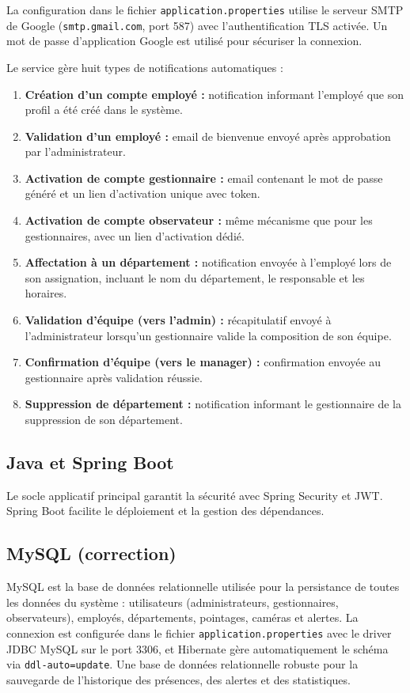 \documentclass[12pt,a4paper]{report}
\numberwithin{figure}{chapter}
\numberwithin{table}{chapter}
\begin{document}
La configuration dans le fichier \texttt{application.properties} utilise le serveur
SMTP de Google (\texttt{smtp.gmail.com}, port 587) avec l'authentification TLS activée.
Un mot de passe d'application Google est utilisé pour sécuriser la connexion.

Le service gère huit types de notifications automatiques :

\begin{enumerate}
  \item \textbf{Création d'un compte employé :} notification informant l'employé que son
    profil a été créé dans le système.
  \item \textbf{Validation d'un employé :} email de bienvenue envoyé après approbation par
    l'administrateur.
  \item \textbf{Activation de compte gestionnaire :} email contenant le mot de passe
    généré et un lien d'activation unique avec token.
  \item \textbf{Activation de compte observateur :} même mécanisme que pour les gestionnaires,
    avec un lien d'activation dédié.
  \item \textbf{Affectation à un département :} notification envoyée à l'employé lors de
    son assignation, incluant le nom du département, le responsable et les horaires.
  \item \textbf{Validation d'équipe (vers l'admin) :} récapitulatif envoyé à l'administrateur
    lorsqu'un gestionnaire valide la composition de son équipe.
  \item \textbf{Confirmation d'équipe (vers le manager) :} confirmation envoyée au
    gestionnaire après validation réussie.
  \item \textbf{Suppression de département :} notification informant le gestionnaire
    de la suppression de son département.
\end{enumerate}

\subsection{Java et Spring Boot}
Le socle applicatif principal garantit la sécurité avec Spring Security et JWT. Spring Boot
facilite le déploiement et la gestion des dépendances.

\subsection{MySQL (correction)}

MySQL est la base de données relationnelle utilisée pour la persistance de toutes
les données du système : utilisateurs (administrateurs, gestionnaires, observateurs),
employés, départements, pointages, caméras et alertes. La connexion est configurée
dans le fichier \texttt{application.properties} avec le driver JDBC MySQL sur le
port 3306, et Hibernate gère automatiquement le schéma via \texttt{ddl-auto=update}.
Une base de données relationnelle robuste pour la sauvegarde de l'historique des présences,
des alertes et des statistiques.
\end{document}

